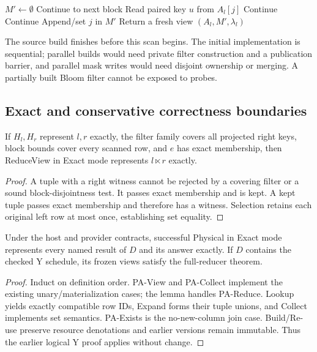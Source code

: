 \begin{algorithm}[tbp]
\caption{Executing Reduce/Filter over a selected block view}
\label{alg:physical-scan}
\begin{algorithmic}[1]
 \State $M'\gets\emptyset$
   \State Continue to next block 
  \EndIf
   \State Read paired key $u$ from $A_l[j]$
    \State Continue  \EndIf
    \State Continue 
   \EndIf
   \State Append/set $j$ in $M'$ 
  \EndFor
 \EndFor
 \State Return a fresh view $(A_l,M',\lambda_l)$
\EndProcedure
\end{algorithmic}
\end{algorithm}
The source build finishes before this scan begins. The initial implementation
is sequential; parallel builds would need private filter construction and a
publication barrier, and parallel mask writes would need disjoint ownership
or merging. A partially built Bloom filter cannot be exposed to probes.

\subsection{Exact and conservative correctness boundaries}
\label{sec:ya-correctness}
\begin{lemma}
If $H_l,H_r$ represent $l,r$ exactly, the filter family covers all projected
right keys, block bounds cover every scanned row, and $e$ has exact membership,
then ReduceView in Exact mode represents $l\ltimes r$ exactly.
\end{lemma}
\begin{proof}
A tuple with a right witness cannot be rejected by a covering filter or a
sound block-disjointness test. It passes exact membership and is kept.
A kept tuple passes exact membership and therefore has a witness. Selection
retains each original left row at most once, establishing set equality.
\end{proof}
\begin{theorem}
Under the host and provider contracts, successful Physical in Exact mode
represents every named result of $D$ and its answer exactly. If $D$ contains
the checked Y schedule, its frozen views satisfy the full-reducer theorem.
\end{theorem}
\begin{proof}
Induct on definition order. PA-View and PA-Collect implement the existing
unary/materialization cases; the lemma handles PA-Reduce. Lookup yields exactly
compatible row IDs, Expand forms their tuple unions, and Collect implements
set semantics. PA-Exists is the no-new-column join case. Build/Re-use preserve
resource denotations and earlier versions remain immutable. Thus the earlier
logical Y proof applies without change.
\end{proof}

